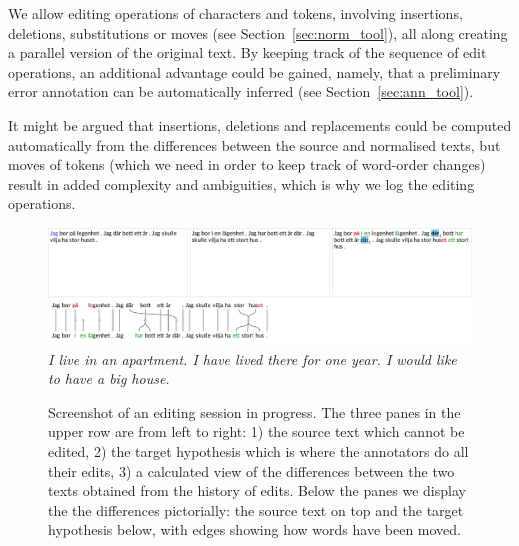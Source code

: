 \documentclass[10pt, a4paper]{article}
\newcommand{\dan}[1]{{\color{Fuchsia}{Dan: #1}}}
\begin{document}
We allow editing operations of characters and tokens, involving insertions, deletions, substitutions %
or moves (see Section~\ref{sec:norm_tool}), all along creating a parallel version of the original text. By keeping track of the sequence of edit operations, an additional advantage could be gained, namely, that a preliminary error annotation can be automatically inferred (see Section~\ref{sec:ann_tool}). %
\dan{Move this overview of the paper to section 1?}

It might be argued that insertions, deletions and
replacements could be computed automatically from the differences between the source and normalised texts, but moves of tokens (which we need in order to keep track of word-order changes) result in added complexity \cite{ShapiraStorer2007} and ambiguities, which is why we log the editing operations.

\begin{figure}
\includegraphics[width=\textwidth, trim={0 0.6cm 0 0}, clip]{screenshot.pdf}
\emph{\small I live in an apartment. I have lived there for one year. I would like to have a big house.}
\caption{Screenshot of an editing session in progress. The three panes in the upper row are from left to right:
1) the source text which cannot be edited,
2) the target hypothesis which is where the annotators do all their edits,
3) a calculated view of the differences between the two texts obtained from the history of edits.
Below the panes we display the the differences pictorially:
the source text on top and the target hypothesis below, with edges
showing how words have been moved.
\label{fig:screenshot}
}
\end{figure}
\end{document}
